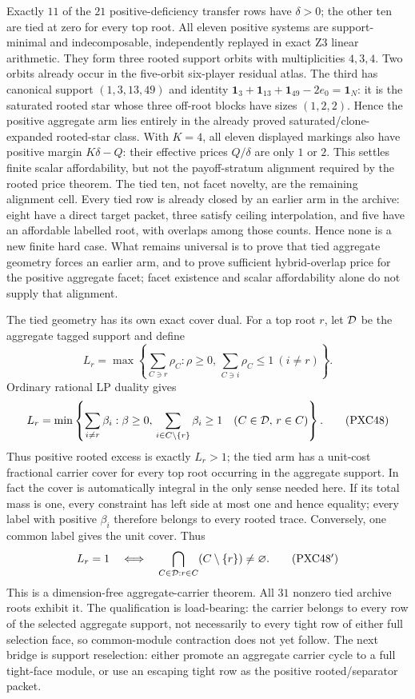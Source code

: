 \documentclass[11pt]{article}
\newcommand{\one}{\mathbf 1}
\begin{document}
Exactly $11$ of the $21$ positive-deficiency transfer rows have
$\delta>0$; the other ten are tied at zero for every top root.  All eleven
positive systems are support-minimal and indecomposable, independently
replayed in exact Z3 linear arithmetic.  They form three rooted support
orbits with multiplicities $4,3,4$.  Two orbits already occur in the
five-orbit six-player residual atlas.  The third has canonical support
$(1,3,13,49)$ and identity
$\one_3+\one_{13}+\one_{49}-2e_0=\one_N$: it is the saturated rooted star
whose three off-root blocks have sizes $(1,2,2)$.  Hence the positive
aggregate arm lies entirely in the already proved saturated/clone-expanded
rooted-star class.  With $K=4$, all eleven displayed markings also have
positive margin $K\delta-Q$: their effective prices $Q/\delta$ are only
$1$ or $2$.  This settles finite scalar affordability, but not the
payoff-stratum alignment required by the rooted price theorem.  The tied
ten, not facet novelty, are the remaining
alignment cell.  Every tied row is already closed by an earlier arm in the
archive: eight have a direct target packet, three satisfy ceiling
interpolation, and five have an affordable labelled root, with overlaps
among those counts.  Hence none is a new finite hard case.  What remains
universal is to prove that tied aggregate geometry forces an earlier arm, and
to prove sufficient hybrid-overlap price for the positive aggregate facet;
facet existence and scalar affordability alone do not supply that alignment.

The tied geometry has its own exact cover dual.  For a top root $r$, let
${\cal D}$ be the aggregate tagged support and define
\[
 L_r=\max\left\{
 \sum_{C\ni r}\rho_C:\rho\ge0,
 \,\sum_{C\ni i}\rho_C\le1\ (i\ne r)
 \right\}.
\]
Ordinary rational LP duality gives
\[
 L_r=\min\left\{
 \sum_{i\ne r}\beta_i:\beta\ge0,
 \,\sum_{i\in C\setminus\{r\}}\beta_i\ge1
 \quad(C\in{\cal D},\,r\in C)
 \right\}.                                           \tag{PXC48}
\]
Thus positive rooted excess is exactly $L_r>1$; the tied arm has a unit-cost
fractional carrier cover for every top root occurring in the aggregate
support.  In fact the cover is automatically integral in the only sense
needed here.  If its total mass is one, every constraint has left side at
most one and hence equality; every label with positive $\beta_i$ therefore
belongs to every rooted trace.  Conversely, one common label gives the unit
cover.  Thus
\[
 L_r=1
 \quad\Longleftrightarrow\quad
 \bigcap_{C\in{\cal D}:r\in C}(C\setminus\{r\})\ne\varnothing .
                                                               \tag{PXC48$'$}
\]
This is a dimension-free aggregate-carrier theorem.  All $31$ nonzero tied
archive roots exhibit it.  The qualification is load-bearing: the carrier
belongs to every row of the selected aggregate support, not necessarily to
every tight row of either full selection face, so common-module contraction
does not yet follow.  The next bridge is support reselection: either promote
an aggregate carrier cycle to a full tight-face module, or use an escaping
tight row as the positive rooted/separator packet.
\end{document}
